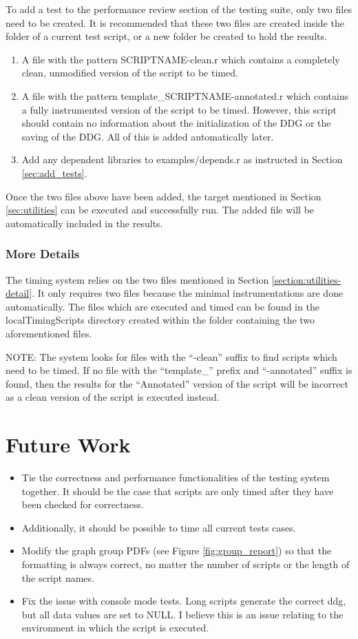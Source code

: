 \documentclass[12pt]{article}
\begin{document}
\bigskip
To add a test to the performance review section of the testing suite, only two files need to be created. It is recommended that these two files are created inside the folder of a current test script, or a new folder be created to hold the results.
\begin{enumerate}
\item A file with the pattern SCRIPTNAME-clean.r which contains a completely clean, unmodified version of the script to be timed.
\item A file with the pattern template\_SCRIPTNAME-annotated.r which contains a fully instrumented version of the script to be timed. However, this script should contain no information about the initialization of the DDG or the saving of the DDG. All of this is added automatically later.
\item Add any dependent libraries to examples/depends.r as instructed in Section \ref{sec:add_tests}.
\end{enumerate}

Once the two files above have been added, the target mentioned in Section \ref{sec:utilities} can be executed and successfully run. The added file will be automatically included in the results.

\subsubsection{More Details}
The timing system relies on the two files mentioned in Section \ref{section:utilities-detail}. It only requires two files because the minimal instrumentations are done automatically. The files which are executed and timed can be found in the localTimingScripts directory created within the folder containing the two aforementioned files.

NOTE: The system looks for files with the ``-clean'' suffix to find scripts which need to be timed. If no file with the ``template\_'' prefix and ``-annotated''  suffix is found, then the results for the ``Annotated'' version of the script will be incorrect as a clean version of the script is executed instead. 

\newpage

\section{Future Work}
\begin{itemize}
\item Tie the correctness and performance functionalities of the testing system together. It should be the case that scripts are only timed after they have been checked for correctness.
\item Additionally, it should be possible to time all current tests cases.
\item Modify the graph group PDFs (see Figure \ref{fig:group_report}) so that the formatting is always correct, no matter the number of scripts or the length of the script names.
\item Fix the issue with console mode tests. Long scripts generate the correct ddg, but all data values are set to NULL. I believe this is an issue relating to the environment in which the script is executed.
\end{itemize}
\end{document}
